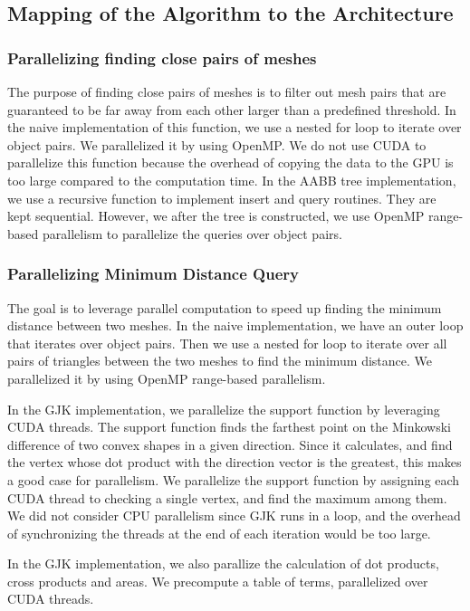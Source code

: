 \documentclass[12pt,fleqn]{article}
\begin{document}
\subsection{Mapping of the Algorithm to the Architecture}
\subsubsection{Parallelizing finding close pairs of meshes}
The purpose of finding close pairs of meshes is to filter out mesh pairs that are guaranteed to be far away from each other larger than a predefined threshold.
In the naive implementation of this function, we use a nested for loop to iterate over object pairs.
We parallelized it by using OpenMP.
We do not use CUDA to parallelize this function because the overhead of copying the data to the GPU is too large compared to the computation time.
In the AABB tree implementation, we use a recursive function to implement insert and query routines. They are kept sequential. However, we after the tree is constructed, we use OpenMP range-based parallelism to parallelize the queries over object pairs.

\subsubsection{Parallelizing Minimum Distance Query}
The goal is to leverage parallel computation to speed up finding the minimum distance between two meshes.
In the naive implementation, we have an outer loop that iterates over object pairs. Then we use a nested for loop to iterate over all pairs of triangles between the two meshes to find the minimum distance. We parallelized it by using OpenMP range-based parallelism.

In the GJK implementation, we parallelize the support function by leveraging CUDA threads. The support function finds the farthest point on the Minkowski difference of two convex shapes in a given direction. Since it calculates, and find the vertex whose dot product with the direction vector is the greatest, this makes a good case for parallelism. We parallelize the support function by assigning each CUDA thread to checking a single vertex, and find the maximum among them. We did not consider CPU parallelism since GJK runs in a loop, and the overhead of synchronizing the threads at the end of each iteration would be too large.

In the GJK implementation, we also parallize the calculation of dot products, cross products and areas. We precompute a table of terms, parallelized over CUDA threads.
\end{document}
